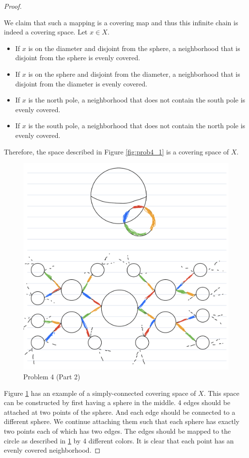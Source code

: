 \documentclass[12pt, psamsfonts]{amsart}
\theoremstyle{definition}
\theoremstyle{remark}
\numberwithin{equation}{section}
\begin{document}
\begin{proof}
\begin{itemize}
      We claim that such a mapping is a covering map and thus this infinite chain is indeed a covering space.
      Let $x \in X$.
      \begin{itemize}
        \item
          If $x$ is on the diameter and disjoint from the sphere, a neighborhood that is disjoint from the sphere is evenly covered.
        \item
          If $x$ is on the sphere and disjoint from the diameter, a neighborhood that is disjoint from the diameter is evenly covered.
        \item
          If $x$ is the north pole, a neighborhood that does not contain the south pole is evenly covered.
        \item
          If $x$ is the south pole, a neighborhood that does not contain the north pole is evenly covered.
      \end{itemize}
  \end{itemize}
  Therefore, the space described in Figure \ref{fig:prob4_1} is a covering space of $X$.
  \begin{figure}
    \includegraphics[width=.5\linewidth]{problem4-2.jpeg}
    \caption{Problem 4 (Part 2)}
    \label{fig:prob4_2}
  \end{figure}

  Figure \ref{fig:prob4_2} has an example of a simply-connected covering space of $X$.
  This space can be constructed by first having a sphere in the middle.
  4 edges should be attached at two points of the sphere.
  And each edge should be connected to a different sphere.
  We continue attaching them such that each sphere has exactly two points each of which has two edges.
  The edges should be mapped to the circle as described in \ref{fig:prob4_2} by 4 different colors.
  It is clear that each point has an evenly covered neighborhood.
\end{proof}
\end{document}
